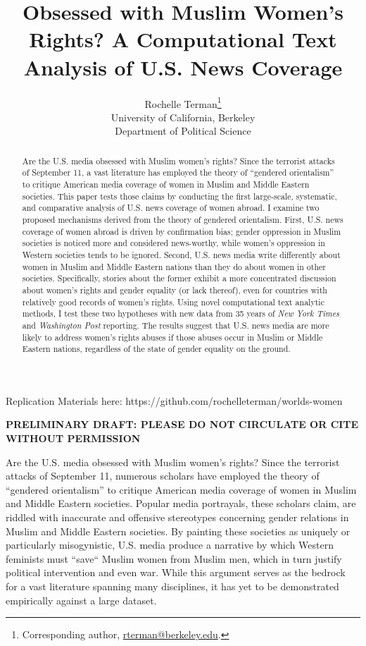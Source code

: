 \documentclass[11pt, oneside]{article}
\title{Obsessed with Muslim Women's Rights? A Computational Text Analysis of U.S. News Coverage}
\author{Rochelle Terman\thanks{Corresponding author, \url{rterman@berkeley.edu}. } \\University of California, Berkeley\\Department of Political Science}
\begin{document}
\maketitle
{}\baselineskip

\setcounter{page}{0}

\maketitle\thispagestyle{empty}

Replication Materials here: https://github.com/rochelleterman/worlds-women

\begin{center}
\textbf{PRELIMINARY DRAFT: PLEASE DO NOT CIRCULATE OR CITE WITHOUT PERMISSION}
\end{center}

\begin{abstract}
\noindent Are the U.S. media obsessed with Muslim women's rights? Since the terrorist attacks of September 11, a vast literature has employed the theory of ``gendered orientalism'' to critique American media coverage of women in Muslim and Middle Eastern societies. This paper tests those claims by conducting the first large-scale, systematic, and comparative analysis of U.S. news coverage of women abroad. I examine two proposed mechanisms derived from the theory of gendered orientalism. First, U.S. news coverage of women abroad is driven by confirmation bias; gender oppression in Muslim societies is noticed more and considered news-worthy, while women's oppression in Western societies tends to be ignored. Second, U.S. news media write differently about women in Muslim and Middle Eastern nations than they do about women in other societies. Specifically, stories about the former exhibit a more concentrated discussion about women's rights and gender equality (or lack thereof), even for countries with relatively good records of women's rights. Using novel computational text analytic methods, I test these two hypotheses with new data from 35 years of \emph{New York Times} and \emph{Washington Post} reporting. The results suggest that U.S. news media are more likely to address women's rights abuses if those abuses occur in Muslim or Middle Eastern nations, regardless of the state of gender equality on the ground.
\end{abstract}

\newpage\doublespace

Are the U.S. media obsessed with Muslim women's rights? Since the terrorist attacks of September 11, numerous scholars have employed the theory of ``gendered orientalism'' to critique American media coverage of women in Muslim and Middle Eastern societies. Popular media portrayals, these scholars claim, are riddled with inaccurate and offensive stereotypes concerning gender relations in Muslim and Middle Eastern societies. By painting these societies as uniquely or particularly misogynistic, U.S. media produce a narrative by which Western feminists must ``save`` Muslim women from Muslim men, which in turn justify political intervention and even war. While this argument serves as the bedrock for a vast literature spanning many disciplines, it has yet to be demonstrated empirically against a large dataset. 
\end{document}
